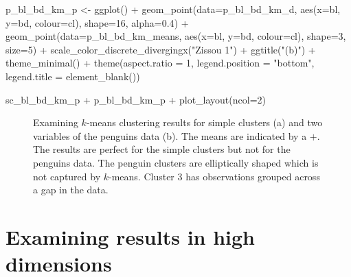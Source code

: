 \documentclass[
  letterpaper,
]{krantz}
\newenvironment{Shaded}{\begin{snugshade}}{\end{snugshade}}
\newcommand{\AttributeTok}[1]{\textcolor[rgb]{0.40,0.45,0.13}{#1}}
\newcommand{\DecValTok}[1]{\textcolor[rgb]{0.68,0.00,0.00}{#1}}
\newcommand{\FloatTok}[1]{\textcolor[rgb]{0.68,0.00,0.00}{#1}}
\newcommand{\FunctionTok}[1]{\textcolor[rgb]{0.28,0.35,0.67}{#1}}
\newcommand{\NormalTok}[1]{\textcolor[rgb]{0.00,0.23,0.31}{#1}}
\newcommand{\OtherTok}[1]{\textcolor[rgb]{0.00,0.23,0.31}{#1}}
\newcommand{\SpecialCharTok}[1]{\textcolor[rgb]{0.37,0.37,0.37}{#1}}
\newcommand{\StringTok}[1]{\textcolor[rgb]{0.13,0.47,0.30}{#1}}
\begin{document}
\begin{Shaded}
\begin{Highlighting}[]
\NormalTok{p\_bl\_bd\_km\_p }\OtherTok{\textless{}{-}} \FunctionTok{ggplot}\NormalTok{() }\SpecialCharTok{+}
  \FunctionTok{geom\_point}\NormalTok{(}\AttributeTok{data=}\NormalTok{p\_bl\_bd\_km\_d, }
             \FunctionTok{aes}\NormalTok{(}\AttributeTok{x=}\NormalTok{bl, }\AttributeTok{y=}\NormalTok{bd, }\AttributeTok{colour=}\NormalTok{cl), }
             \AttributeTok{shape=}\DecValTok{16}\NormalTok{, }\AttributeTok{alpha=}\FloatTok{0.4}\NormalTok{) }\SpecialCharTok{+}
  \FunctionTok{geom\_point}\NormalTok{(}\AttributeTok{data=}\NormalTok{p\_bl\_bd\_km\_means, }
             \FunctionTok{aes}\NormalTok{(}\AttributeTok{x=}\NormalTok{bl, }\AttributeTok{y=}\NormalTok{bd, }\AttributeTok{colour=}\NormalTok{cl), }
             \AttributeTok{shape=}\DecValTok{3}\NormalTok{, }\AttributeTok{size=}\DecValTok{5}\NormalTok{) }\SpecialCharTok{+}
    \FunctionTok{scale\_color\_discrete\_divergingx}\NormalTok{(}\StringTok{"Zissou 1"}\NormalTok{) }\SpecialCharTok{+}
  \FunctionTok{ggtitle}\NormalTok{(}\StringTok{"(b)"}\NormalTok{) }\SpecialCharTok{+}
  \FunctionTok{theme\_minimal}\NormalTok{() }\SpecialCharTok{+}
  \FunctionTok{theme}\NormalTok{(}\AttributeTok{aspect.ratio =} \DecValTok{1}\NormalTok{, }
        \AttributeTok{legend.position =} \StringTok{"bottom"}\NormalTok{,}
        \AttributeTok{legend.title =} \FunctionTok{element\_blank}\NormalTok{()) }

\NormalTok{sc\_bl\_bd\_km\_p }\SpecialCharTok{+}\NormalTok{ p\_bl\_bd\_km\_p }\SpecialCharTok{+} \FunctionTok{plot\_layout}\NormalTok{(}\AttributeTok{ncol=}\DecValTok{2}\NormalTok{)}
\end{Highlighting}
\end{Shaded}

\begin{figure}[H]


\caption{\label{fig-km-2D}Examining \(k\)-means clustering results for
simple clusters (a) and two variables of the penguins data (b). The
means are indicated by a \(+\). The results are perfect for the simple
clusters but not for the penguins data. The penguin clusters are
elliptically shaped which is not captured by \(k\)-means. Cluster 3 has
observations grouped across a gap in the data.}

\end{figure}%

\section{Examining results in high
dimensions}\label{examining-results-in-high-dimensions}
\end{document}
